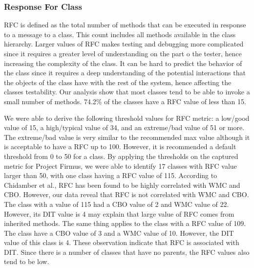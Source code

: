 \subsubsection{Response For Class}
RFC is defined as the total number of methods that can be executed in response to a message to a class. This count includes all methods available in the class hierarchy. Larger values of RFC makes testing and debugging more complicated since it requires a greater level of understanding on the part o the tester\cite{chidamber1994metrics}, hence increasing the complexity of the class. It can be hard to predict the behavior of the class since it requires a deep understanding of the potential interactions that the objects of the class have with the rest of the system, hence affecting the classes testability. Our analysis show that most classes tend to be able to invoke a small number of methods. 74.2\% of the classes have a RFC value of less than 15.

We were able to derive the following threshold values for RFC metric: a low/good value of 15, a high/typical value of 34, and an extreme/bad value of 51 or more. The extreme/bad value is very similar to the recommended max value although it is acceptable to have a RFC up to 100\cite{metricoverview}. However, it is recommended a default threshold from 0 to 50 for a class. By applying the thresholds on the captured metric for Project Firmus, we were able to identify 17 classes with RFC value larger than 50, with one class having a RFC value of 115. According to Chidamber et al.\cite{chidamber1998managerial}, RFC has been found to be highly correlated with WMC and CBO. However, our data reveal that RFC is not correlated with WMC and CBO. The class with a value of 115 had a CBO value of 2 and WMC value of 22. However, its DIT value is 4 may explain that large value of RFC comes from inherited methods. The same thing applies to the class with a RFC value of 109. The class have a CBO value of 3 and a WMC value of 10. However, the DIT value of this class is 4. These observation indicate that RFC is associated with DIT. Since there is a number of classes that have no parents, the RFC values also tend to be low. 


